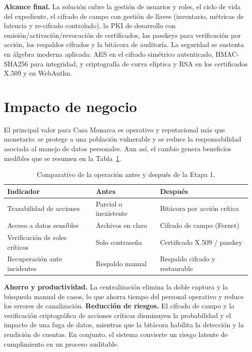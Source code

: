 \documentclass[10pt,letterpaper]{report}
\begin{document}
\textbf{Alcance final.} La solución cubre la gestión de usuarios y roles, el
ciclo de vida del expediente, el cifrado de campo con gestión de llaves
(inventario, métricas de latencia y re-cifrado controlado), la PKI de desarrollo
con emisión/activación/revocación de certificados, las passkeys para
verificación por acción, los respaldos cifrados y la bitácora de auditoría. La
seguridad se sustenta en álgebra moderna aplicada: AES en el cifrado simétrico
autenticado, HMAC-SHA256 para integridad, y criptografía de curva elíptica y RSA
en los certificados X.509 y en WebAuthn.

\section{Impacto de negocio}

El principal valor para Casa Monarca es operativo y reputacional más que
monetario: se protege a una población vulnerable y se reduce la responsabilidad
asociada al manejo de datos personales. Aun así, el cambio genera beneficios
medibles que se resumen en la Tabla~\ref{tab:impacto}.

\begin{table}[h]
\centering
\renewcommand{\arraystretch}{1.2}
\begin{tabular}{>{\raggedright\arraybackslash}p{5.0cm} >{\raggedright\arraybackslash}p{4.2cm} >{\raggedright\arraybackslash}p{4.2cm}}
\toprule
\textbf{Indicador} & \textbf{Antes} & \textbf{Después} \\
\midrule
Trazabilidad de acciones & Parcial o inexistente & Bitácora por acción crítica \\
Acceso a datos sensibles & Archivos en claro & Cifrado de campo (Fernet) \\
Verificación de roles críticos & Solo contraseña & Certificado X.509 / passkey \\
Recuperación ante incidentes & Respaldo manual & Respaldo cifrado y restaurable \\
\bottomrule
\end{tabular}
\caption{Comparativo de la operación antes y después de la Etapa 1.}
\label{tab:impacto}
\end{table}

\textbf{Ahorro y productividad.} La centralización elimina la doble captura y la
búsqueda manual de casos, lo que ahorra tiempo del personal operativo y reduce
los errores de canalización. \textbf{Reducción de riesgos.} El cifrado de campo
y la verificación criptográfica de acciones críticas disminuyen la probabilidad
y el impacto de una fuga de datos, mientras que la bitácora habilita la
detección y la rendición de cuentas. En conjunto, el sistema convierte un riesgo
latente de cumplimiento en un proceso auditable.
\end{document}
